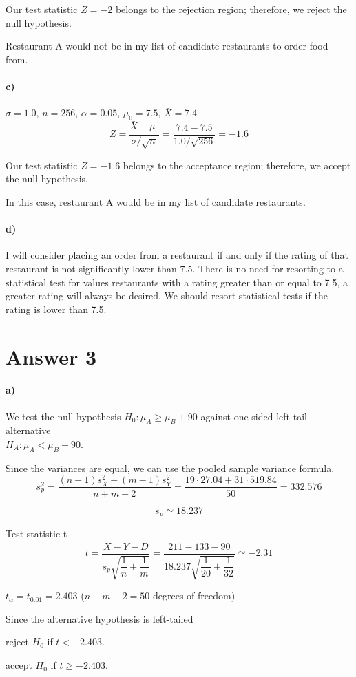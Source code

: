 \documentclass[12pt]{article}
\begin{document}
Our test statistic $Z = -2$ belongs to the rejection region; therefore, we reject the null hypothesis.

Restaurant A would not be in my list of candidate restaurants to order food from.
\paragraph{c)}
$\sigma = 1.0$, $n = 256$, $\alpha = 0.05$, $\mu_0 = 7.5$, $\bar{X}=7.4$
\[
    Z = \frac{\bar{X} - \mu_0}{\sigma/\sqrt{n}} = \frac{7.4 - 7.5}{1.0/\sqrt{256}} = -1.6
\]

Our test statistic $Z = -1.6$ belongs to the acceptance region; therefore, we accept the null hypothesis.

In this case, restaurant A would be in my list of candidate restaurants.
\paragraph{d)}
I will consider placing an order from a restaurant if and only if the rating of that restaurant is not significantly lower than 7.5. There is no need for resorting to a statistical test for values restaurants with a rating greater than or equal to 7.5, a greater rating will always be desired. We should resort statistical tests if the rating is lower than 7.5.
\section*{Answer 3}
\paragraph{a)}
We test the null hypothesis $H_0: \mu_A \geq \mu_B + 90$ against one sided left-tail alternative\\$H_A: \mu_A < \mu_B + 90$.

Since the variances are equal, we can use the pooled sample variance formula.
\[
    s_p^2 = \dfrac{(n-1)s_X^2 + (m-1)s_Y^2}{n+m-2} = \dfrac{19\cdot27.04 + 31\cdot519.84}{50} = 332.576
\]

\[
    s_p \simeq 18.237
\]

Test statistic t
\[
    t = \frac{\bar{X} - \bar{Y} - D}{s_p\sqrt{\dfrac{1}{n}+\dfrac{1}{m}}} = \frac{211 - 133 - 90}{18.237\sqrt{\dfrac{1}{20}+\dfrac{1}{32}}} \simeq -2.31
\]

$t_\alpha = t_{0.01} = 2.403$ ($n + m - 2 = 50$ degrees of freedom)

Since the alternative hypothesis is left-tailed
\begin{center}
    reject $H_0$ if $t < -2.403$.

    accept $H_0$ if $t \geq -2.403$.
\end{center}
\end{document}
